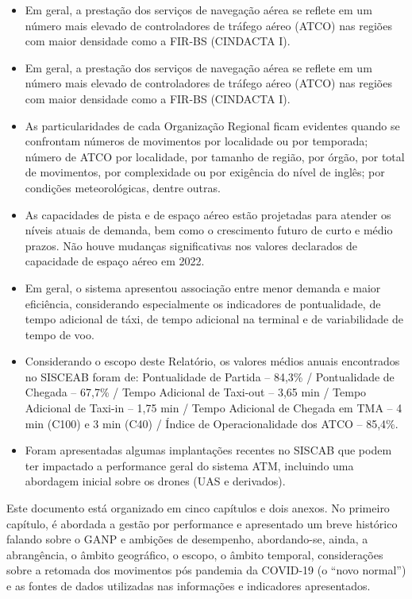 \documentclass[
]{book}
\providecommand{\tightlist}{%
  \setlength{\itemsep}{0pt}\setlength{\parskip}{0pt}}
\theoremstyle{definition}
\theoremstyle{definition}
\theoremstyle{definition}
\theoremstyle{definition}
\theoremstyle{remark}
\begin{document}
\begin{itemize}
\tightlist
\item
  Em geral, a prestação dos serviços de navegação aérea se reflete em um número mais elevado de controladores de tráfego aéreo (ATCO) nas regiões com maior densidade como a FIR-BS (CINDACTA I).
\item
  Em geral, a prestação dos serviços de navegação aérea se reflete em um número mais elevado de controladores de tráfego aéreo (ATCO) nas regiões com maior densidade como a FIR-BS (CINDACTA I).
\item
  As particularidades de cada Organização Regional ficam evidentes quando se confrontam números de movimentos por localidade ou por temporada; número de ATCO por localidade, por tamanho de região, por órgão, por total de movimentos, por complexidade ou por exigência do nível de inglês; por condições meteorológicas, dentre outras.
\item
  As capacidades de pista e de espaço aéreo estão projetadas para atender os níveis atuais de demanda, bem como o crescimento futuro de curto e médio prazos. Não houve mudanças significativas nos valores declarados de capacidade de espaço aéreo em 2022.
\item
  Em geral, o sistema apresentou associação entre menor demanda e maior eficiência, considerando especialmente os indicadores de pontualidade, de tempo adicional de táxi, de tempo adicional na terminal e de variabilidade de tempo de voo.
\item
  Considerando o escopo deste Relatório, os valores médios anuais encontrados no SISCEAB foram de: Pontualidade de Partida -- 84,3\% / Pontualidade de Chegada -- 67,7\% / Tempo Adicional de Taxi-out -- 3,65 min / Tempo Adicional de Taxi-in -- 1,75 min / Tempo Adicional de Chegada em TMA -- 4 min (C100) e 3 min (C40) / Índice de Operacionalidade dos ATCO -- 85,4\%.
\item
  Foram apresentadas algumas implantações recentes no SISCAB que podem ter impactado a performance geral do sistema ATM, incluindo uma abordagem inicial sobre os drones (UAS e derivados).
\end{itemize}

Este documento está organizado em cinco capítulos e dois anexos. No primeiro capítulo, é abordada a gestão por performance e apresentado um breve histórico falando sobre o GANP e ambições de desempenho, abordando-se, ainda, a abrangência, o âmbito geográfico, o escopo, o âmbito temporal, considerações sobre a retomada dos movimentos pós pandemia da COVID-19 (o ``novo normal'') e as fontes de dados utilizadas nas informações e indicadores apresentados.
\end{document}
